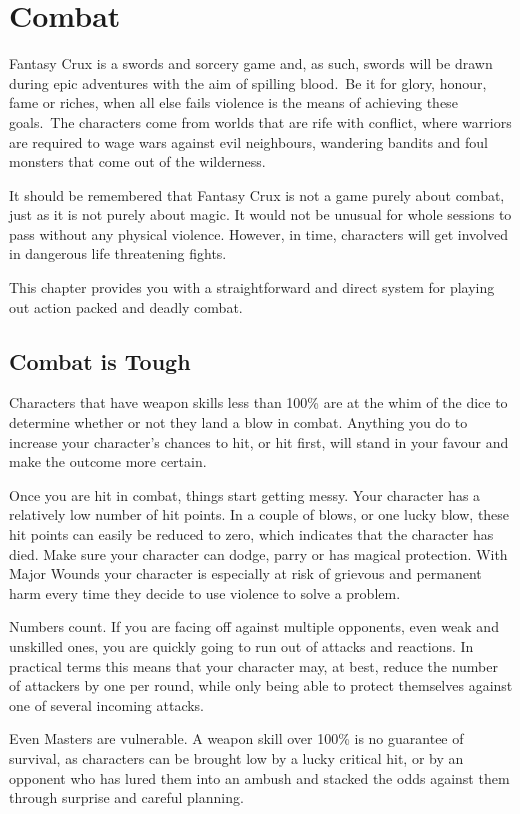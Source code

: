\chapter{Combat}
\label{ch:combat}

Fantasy Crux is a swords and sorcery game and, as such, swords will be drawn during epic adventures with the aim of spilling blood. Be it for glory, honour, fame or riches, when all else fails violence is the means of achieving these goals. The characters come from worlds that are rife with conflict, where warriors are required to wage wars against evil neighbours, wandering bandits and foul monsters that come out of the wilderness.  

It should be remembered that Fantasy Crux is not a game purely about combat, just as it is not purely about magic. It would not be unusual for whole sessions to pass without any physical violence. However, in time, characters will get involved in dangerous life threatening fights. 

This chapter provides you with a straightforward and direct system for playing out action packed and deadly combat.

\section{Combat is Tough}
Characters that have weapon skills less than 100\% are at the whim of the dice to determine whether or not they land a blow in combat. Anything you do to increase your character’s chances to hit, or hit first, will stand in your favour and make the outcome more certain.

Once you are hit in combat, things start getting messy. Your character has a relatively low number of hit points. In a couple of blows, or one lucky blow, these hit points can easily be reduced to zero, which indicates that the character has died. Make sure your character can dodge, parry or has magical protection. With Major Wounds your character is especially at risk of grievous and permanent harm every time they decide to use violence to solve a problem.

Numbers count. If you are facing off against multiple opponents, even weak and unskilled ones, you are quickly going to run out of attacks and reactions. In practical terms this means that your character may, at best, reduce the number of attackers by one per round, while only being able to protect themselves against one of several incoming attacks. 

Even Masters are vulnerable. A weapon skill over 100\% is no guarantee of survival, as characters can be brought low by a lucky critical hit, or by an opponent who has lured them into an ambush and stacked the odds against them through surprise and careful planning. 

